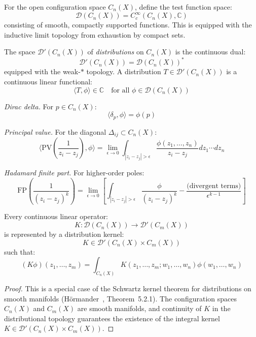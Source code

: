 \begin{definition}\label{def:test-functions}
For the open configuration space $C_n(X)$, define the test function space:
\[\mathcal{D}(C_n(X)) = C_c^\infty(C_n(X), \mathbb{C})\]
consisting of smooth, compactly supported functions. This is equipped with the 
inductive limit topology from exhaustion by compact sets.
\end{definition}

\begin{definition}\label{def:distributions}
The space $\mathcal{D}'(C_n(X))$ of \emph{distributions} on $C_n(X)$ is the 
continuous dual:
\[\mathcal{D}'(C_n(X)) = \mathcal{D}(C_n(X))^*\]
equipped with the weak-$*$ topology. A distribution $T \in \mathcal{D}'(C_n(X))$ 
is a continuous linear functional:
\[\langle T, \phi \rangle \in \mathbb{C} \quad \text{for all } \phi \in \mathcal{D}(C_n(X))\]
\end{definition}

\begin{example}\label{ex:fundamental-distributions}
\emph{Dirac delta.} For $p \in C_n(X)$:
\[\langle \delta_p, \phi \rangle = \phi(p)\]

\emph{Principal value.} For the diagonal $\Delta_{ij} \subset C_n(X)$:
\[\langle \text{PV}\left(\frac{1}{z_i - z_j}\right), \phi \rangle = 
\lim_{\epsilon \to 0} \int_{|z_i - z_j| > \epsilon} \frac{\phi(z_1, \ldots, z_n)}{z_i - z_j} 
dz_1 \cdots dz_n\]

\emph{Hadamard finite part.} For higher-order poles:
\[\text{FP}\left(\frac{1}{(z_i - z_j)^k}\right) = 
\lim_{\epsilon \to 0} \left[\int_{|z_i - z_j| > \epsilon} \frac{\phi}{(z_i - z_j)^k} - 
\frac{\text{(divergent terms)}}{\epsilon^{k-1}}\right]\]
\end{example}

\begin{theorem}\label{thm:schwartz-kernel-cobar}
Every continuous linear operator:
\[K: \mathcal{D}(C_n(X)) \to \mathcal{D}'(C_m(X))\]
is represented by a distribution kernel:
\[K \in \mathcal{D}'(C_n(X) \times C_m(X))\]
such that:
\[(K\phi)(z_1, \ldots, z_m) = \int_{C_n(X)} K(z_1, \ldots, z_m; w_1, \ldots, w_n) \phi(w_1, \ldots, w_n)\]
\end{theorem}

\begin{proof}
This is a special case of the Schwartz kernel theorem for distributions on smooth manifolds (H\"ormander~\cite{Hormander}, Theorem~5.2.1).  The configuration spaces $C_n(X)$ and $C_m(X)$ are smooth manifolds, and continuity of $K$ in the distributional topology guarantees the existence of the integral kernel $K \in \mathcal{D}'(C_n(X) \times C_m(X))$.
\end{proof}

